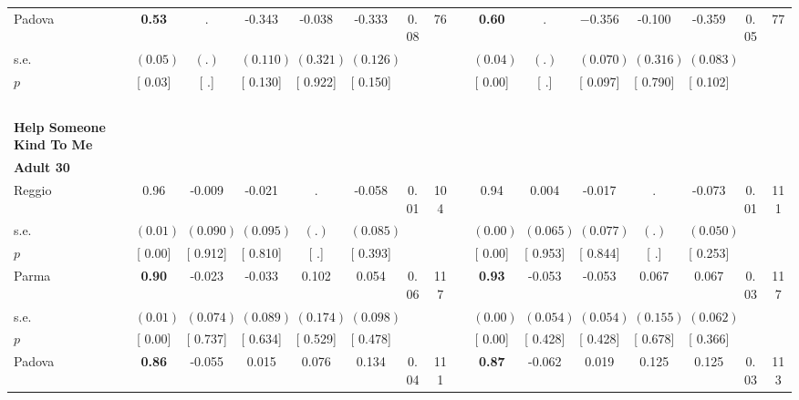 \begin{longtable}{L{8em} c c c c c c c p{1em} c c c c c c c}
\quad \quad \quad Padova& \textbf{     0.53} &         . &    -0.343 &    -0.038 &    -0.333 &      0.08 &        76 & & \textbf{     0.60} &         . & $ \mathbf{   -0.356}$ &    -0.100 &    -0.359 &      0.05 &        77  \\*
\quad \quad \quad \quad s.e.& $ (     0.05)$ & $ (        .)$ & $ (    0.110)$ & $ (    0.321)$ & $ (    0.126)$ & & & & $ (     0.04)$ & $ (        .)$ & $ (    0.070)$ & $ (    0.316)$ & $ (    0.083)$ & &  \\*
\quad \quad \quad \quad $ p$ & [     0.03] & [        .] & [    0.130] & [    0.922] & [    0.150] & & & & [     0.00] & [        .] & [    0.097] & [    0.790] & [    0.102] & &  \\[1em]
~\\[1em]
\textbf{Help Someone Kind To Me} \\*
\quad \quad \textbf{Adult 30} & & & & & & & & & & & & & & & \\* 
\quad \quad \quad Reggio& 0.96 &    -0.009 &    -0.021 &         . &    -0.058 &      0.01 &       104 & & 0.94 &     0.004 &    -0.017 &         . &    -0.073 &      0.01 &       111  \\*
\quad \quad \quad \quad s.e.& $ (     0.01)$ & $ (    0.090)$ & $ (    0.095)$ & $ (        .)$ & $ (    0.085)$ & & & & $ (     0.00)$ & $ (    0.065)$ & $ (    0.077)$ & $ (        .)$ & $ (    0.050)$ & &  \\*
\quad \quad \quad \quad $ p$ & [     0.00] & [    0.912] & [    0.810] & [        .] & [    0.393] & & & & [     0.00] & [    0.953] & [    0.844] & [        .] & [    0.253] & &  \\[1em]
\quad \quad \quad Parma& \textbf{     0.90} &    -0.023 &    -0.033 &     0.102 &     0.054 &      0.06 &       117 & & \textbf{     0.93} &    -0.053 &    -0.053 &     0.067 &     0.067 &      0.03 &       117  \\*
\quad \quad \quad \quad s.e.& $ (     0.01)$ & $ (    0.074)$ & $ (    0.089)$ & $ (    0.174)$ & $ (    0.098)$ & & & & $ (     0.00)$ & $ (    0.054)$ & $ (    0.054)$ & $ (    0.155)$ & $ (    0.062)$ & &  \\*
\quad \quad \quad \quad $ p$ & [     0.00] & [    0.737] & [    0.634] & [    0.529] & [    0.478] & & & & [     0.00] & [    0.428] & [    0.428] & [    0.678] & [    0.366] & &  \\[1em]
\quad \quad \quad Padova& \textbf{     0.86} &    -0.055 &     0.015 &     0.076 &     0.134 &      0.04 &       111 & & \textbf{     0.87} &    -0.062 &     0.019 &     0.125 &     0.125 &      0.03 &       113  \\*

\end{longtable}
